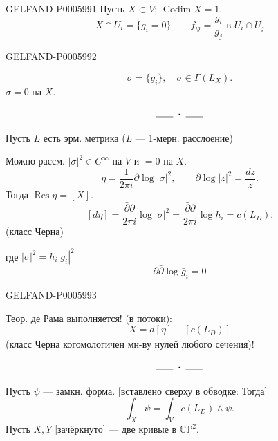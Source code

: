 \begin{GelfandAdjacentEvidence}{GELFAND-P000599}{1}
Пусть \(X\subset V\); \(\operatorname{Codim}X=1\).
\[
X\cap U_i=\{g_i=0\}\qquad f_{ij}=\frac{g_i}{g_j}\text{ в }U_i\cap U_j
\]
\end{GelfandAdjacentEvidence}
\begin{GelfandAdjacentEvidence}{GELFAND-P000599}{2}

\[
\sigma=\{g_i\},\quad\sigma\in\Gamma(L_X).
\]
\(\sigma=0\) на \(X\).

\[\rule{1.8em}{.4pt}\;\boldsymbol{\cdot}\;\rule{1.8em}{.4pt}\]

Пусть \(L\) есть эрм. метрика (\(L\) — 1-мерн. расслоение)

Можно рассм. \(|\sigma|^2\in C^\infty\) на \(V\) и \(=0\) на \(X\).
\[
\eta=\frac{1}{2\pi i}\partial\log|\sigma|^2,\qquad
\partial\log|z|^2=\frac{dz}{z}.
\]
Тогда \(\operatorname{Res}\eta=[X]\).
\[
[d\eta]=\frac{\bar\partial\partial}{2\pi i}\log|\sigma|^2
=\frac{\bar\partial\partial}{2\pi i}\log h_i=c(L_D).
\]
\hfill\underline{(класс Черна)}

где \(|\sigma|^2=h_i|g_i|^2\)
\[
\partial\bar\partial\log\bar g_i=0
\]
\end{GelfandAdjacentEvidence}
\begin{GelfandAdjacentEvidence}{GELFAND-P000599}{3}


Теор. де Рама выполняется! (в потоки):
\[
\underline{X=d[\eta]+[c(L_D)]}
\]
(класс Черна когомологичен мн-ву нулей любого сечения)!

\[\rule{1.8em}{.4pt}\;\boldsymbol{\cdot}\;\rule{1.8em}{.4pt}\]

Пусть \(\psi\) — замкн. форма. [вставлено сверху в обводке: Тогда]
\[
\int_X\psi=\int_V c(L_D)\wedge\psi.
\]
 Пусть \(X,Y\) [зачёркнуто] — две кривые в \(\mathbb C\mathbb P^2\).
\end{GelfandAdjacentEvidence}
